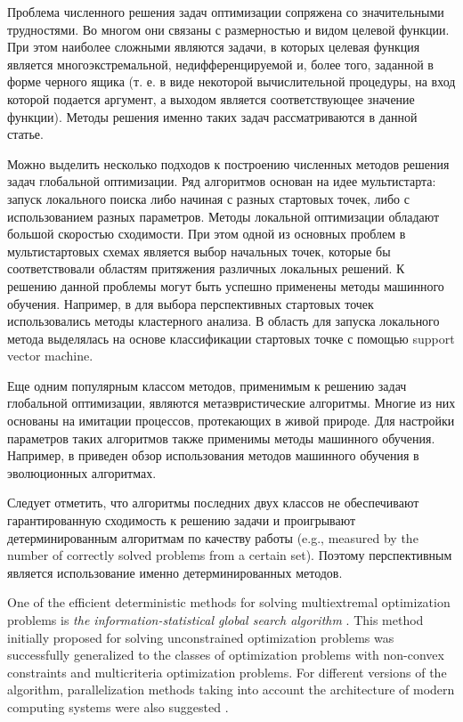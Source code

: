\documentclass[entropy,article,submit,moreauthors,pdftex]{Definitions/mdpi}
\begin{document}
Проблема численного решения задач оптимизации сопряжена со значительными трудностями. Во многом они связаны с размерностью и видом целевой функции. При этом наиболее сложными являются задачи, в которых целевая функция является многоэкстремальной, недифференцируемой и, более того, заданной в форме черного ящика (т. е. в виде некоторой вычислительной процедуры, на вход которой подается аргумент, а выходом является соответствующее значение функции). Методы решения именно таких задач рассматриваются в данной статье. 

Можно выделить несколько подходов к построению численных методов решения задач глобальной оптимизации. 
Ряд алгоритмов основан на идее мультистарта: запуск локального поиска либо начиная с разных стартовых точек, либо с использованием разных параметров. Методы локальной оптимизации обладают большой скоростью сходимости. При этом одной из основных проблем в мультистартовых схемах является выбор начальных точек, которые бы соответствовали областям притяжения различных локальных решений. 
К решению данной проблемы могут быть успешно применены методы машинного обучения. 
Например, в \cite{RinnooyKan1987} для выбора перспективных стартовых точек использовались методы кластерного анализа. 
В \cite{Cassioli2012} область для запуска локального метода выделялась на основе классификации стартовых точке с помощью support vector machine.

Еще одним популярным классом методов, применимым к решению задач глобальной оптимизации, являются метаэвристические алгоритмы. 
Многие из них основаны на имитации процессов, протекающих в живой природе. Для настройки параметров таких алгоритмов также применимы методы машинного обучения. Например, в \cite{Jin2005} приведен обзор использования методов машинного обучения в эволюционных алгоритмах.

Следует отметить, что алгоритмы последних двух классов не обеспечивают гарантированную сходимость к решению задачи и проигрывают детерминированным алгоритмам по качеству работы \cite{Kvasov2018,Sergeyev2018} (e.g., measured by the number of correctly solved problems from a certain set). Поэтому перспективным является использование именно детерминированных методов.


One of the efficient deterministic methods for solving multiextremal optimization problems is \textit{the information-statistical global search algorithm} \cite{Strongin2000}. This method initially proposed for solving unconstrained optimization problems was successfully generalized to the classes of optimization problems with non-convex constraints and multicriteria optimization problems. For different versions of the algorithm, parallelization methods taking into account the architecture of modern computing systems were also suggested \cite{Barkalov2016,globalizerSystem,Strongin2018}.
\end{document}
